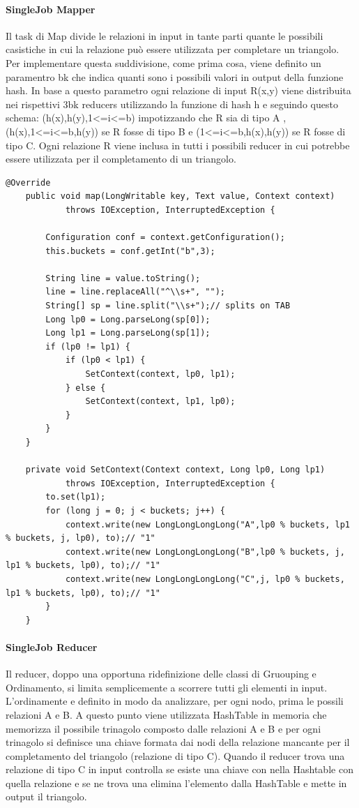 \documentclass[paper=a4, fontsize=11pt]{scrartcl}	%
\numberwithin{equation}{section}															%
\numberwithin{figure}{section}																%
\numberwithin{table}{section}																%
\begin{document}
\paragraph{SingleJob Mapper}
Il task di Map divide le relazioni in input in tante parti quante le possibili casistiche in cui la relazione può essere utilizzata per completare un triangolo.\\
Per implementare questa suddivisione, come prima cosa, viene definito un paramentro bk che indica quanti sono i possibili valori in output della funzione hash. In base a questo parametro ogni relazione di input R(x,y) viene distribuita nei rispettivi 3bk reducers utilizzando la funzione di hash h e seguindo questo schema: (h(x),h(y),1<=i<=b) impotizzando che R sia di tipo A , (h(x),1<=i<=b,h(y)) se R fosse di tipo B e (1<=i<=b,h(x),h(y)) se R fosse di tipo C. Ogni relazione R viene inclusa in tutti i possibili reducer in cui potrebbe essere utilizzata per il completamento di un triangolo.


 
\begin{lstlisting}[label=Mapper,caption=Implementazione del Mapper single Job]
	@Override
	public void map(LongWritable key, Text value, Context context)
			throws IOException, InterruptedException {

		Configuration conf = context.getConfiguration();
		this.buckets = conf.getInt("b",3);
		
		String line = value.toString();
		line = line.replaceAll("^\\s+", "");
		String[] sp = line.split("\\s+");// splits on TAB
		Long lp0 = Long.parseLong(sp[0]);
		Long lp1 = Long.parseLong(sp[1]);
		if (lp0 != lp1) {
			if (lp0 < lp1) {
				SetContext(context, lp0, lp1);
			} else {
				SetContext(context, lp1, lp0);
			}
		}
	}

	private void SetContext(Context context, Long lp0, Long lp1)
			throws IOException, InterruptedException {
		to.set(lp1);
		for (long j = 0; j < buckets; j++) {
			context.write(new LongLongLongLong("A",lp0 % buckets, lp1 % buckets, j, lp0), to);// "1"
			context.write(new LongLongLongLong("B",lp0 % buckets, j, lp1 % buckets, lp0), to);// "1"
			context.write(new LongLongLongLong("C",j, lp0 % buckets, lp1 % buckets, lp0), to);// "1"
		}
	}
\end{lstlisting}
\paragraph{SingleJob Reducer}
Il reducer, doppo una opportuna ridefinizione delle classi di Gruouping e Ordinamento, si limita semplicemente a scorrere tutti gli elementi in input. L'ordinamente e definito in modo da analizzare, per ogni nodo, prima le possili relazioni A e B. A questo punto viene utilizzata HashTable in memoria che memorizza il possibile trinagolo composto dalle relazioni A e B e per ogni trinagolo si definisce una chiave formata dai nodi della relazione mancante per il completamento del triangolo (relazione di tipo C). Quando il reducer trova una relazione di tipo C in input controlla se esiste una chiave con nella Hashtable con quella relazione e se ne trova una elimina l'elemento dalla HashTable e mette in output il triangolo.
 
\end{document}
